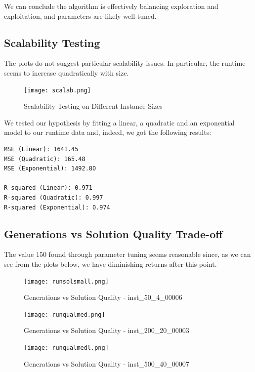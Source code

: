 \documentclass{article}
\begin{document}
We can conclude the algorithm is effectively balancing exploration and exploitation, and parameters are likely well-tuned.

\subsection{Scalability Testing}

The plots do not suggest particular scalability issues. In particular, the runtime seems to increase quadratically with size. 

\begin{figure}[H]
    \centering
    \texttt{[image: scalab.png]}
    \caption{Scalability Testing on Different Instance Sizes}
    \label{fig:enter-label}
\end{figure}

We tested our hypothesis by fitting a linear, a quadratic and an exponential model to our runtime data and, indeed, we got the following results:

\begin{verbatim}
MSE (Linear): 1641.45
MSE (Quadratic): 165.48
MSE (Exponential): 1492.80

R-squared (Linear): 0.971
R-squared (Quadratic): 0.997
R-squared (Exponential): 0.974
\end{verbatim}

\subsection{Generations vs Solution Quality Trade-off}

The value $150$ found through parameter tuning seems reasonable since, as we can see from the plots below, we have diminishing returns after this point.

\begin{figure}[H]
    \centering
    \texttt{[image: runsolsmall.png]}
    \caption{Generations vs Solution Quality - inst\_50\_4\_00006}
    \label{fig:enter-label}
\end{figure}

\begin{figure}[H]
    \centering
    \texttt{[image: runqualmed.png]}
    \caption{Generations vs Solution Quality - inst\_200\_20\_00003}
    \label{fig:enter-label}
\end{figure}

\begin{figure}[H]
    \centering
    \texttt{[image: runqualmedl.png]}
    \caption{Generations vs Solution Quality - inst\_500\_40\_00007}
    \label{fig:enter-label}
\end{figure}
\end{document}
